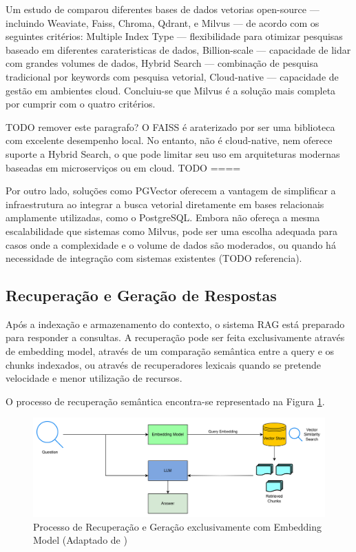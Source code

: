 Um estudo de \cite{wang2024searching} comparou diferentes bases de dados vetorias open-source  — incluindo Weaviate, Faiss, Chroma, Qdrant, e Milvus  — de acordo com os seguintes critérios: Multiple Index Type — flexibilidade para otimizar pesquisas baseado em diferentes carateristicas de dados, Billion-scale — capacidade de lidar com grandes volumes de dados, Hybrid Search — combinação de pesquisa tradicional por keywords com pesquisa vetorial, Cloud-native — capacidade de gestão em ambientes cloud. Concluiu-se que Milvus é a solução mais completa por cumprir com o quatro critérios. 


TODO remover este paragrafo? 
O FAISS é araterizado por ser uma biblioteca com excelente desempenho local. No entanto, não é cloud-native, nem oferece suporte a Hybrid Search, o que pode limitar seu uso em arquiteturas modernas baseadas em microserviços ou em cloud.
TODO ====

Por outro lado, soluções como PGVector oferecem a vantagem de simplificar a infraestrutura ao integrar a busca vetorial diretamente em bases relacionais amplamente utilizadas, como o PostgreSQL. Embora não ofereça a mesma escalabilidade que sistemas como Milvus, pode ser uma escolha adequada para casos onde a complexidade e o volume de dados são moderados, ou quando há necessidade de integração com sistemas existentes (TODO referencia).


\subsection{Recuperação e Geração de Respostas}
\label{recu-context}


Após a indexação e armazenamento do contexto, o sistema RAG está preparado para responder a consultas. A recuperação pode ser feita exclusivamente através de embedding model, através de um comparação semântica entre a query e os chunks indexados, ou através de recuperadores lexicais quando se pretende velocidade e menor utilização de recursos. 

O processo de recuperação semântica encontra-se representado na Figura \ref{fig:acrh-retrieval}. 


\begin{figure}[H]
        \centering
        \includegraphics[width=1\linewidth]{ch3/assets/arq-retrieval.png}
        \caption{Processo de Recuperação e Geração exclusivamente com Embedding Model (Adaptado de \cite{vspeleticexploring})}
        \label{fig:acrh-retrieval}
\end{figure}


